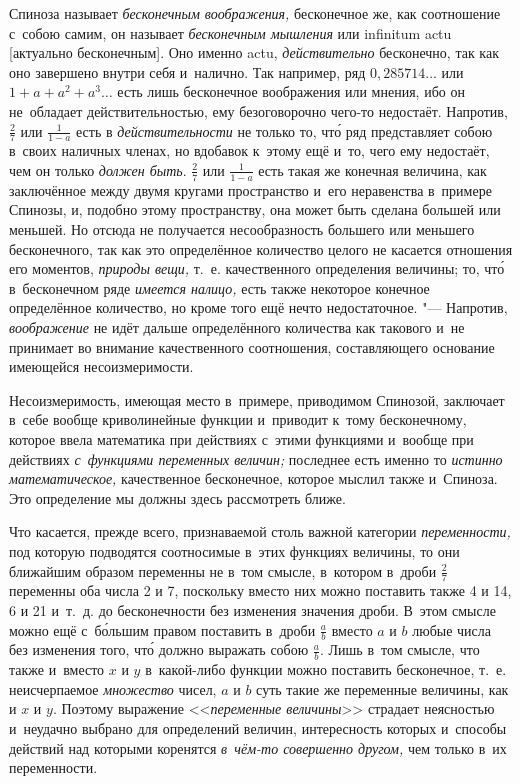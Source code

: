 Спиноза называет {\em бесконечным воображения,} бесконечное же, как соотношение
с~собою самим, он называет {\em бесконечным мышления} или infi\-ni\-tum actu
[актуально бесконечным]. Оно именно actu, {\em действительно} бесконечно, так
как оно завершено внутри себя и~налично. Так например, ряд $0{,}285714\ldots$
или $1+a+a^2+a^3\ldots$ есть лишь бесконечное воображения или мнения, ибо он
не~обладает действительностью, ему безоговорочно чего-то недостаёт. Напротив,
$\frac 2 7$ или $\frac 1{1-a}$ есть в {\em действительности} не только то, чт\'{о} ряд
представляет собою в~своих наличных членах, но вдобавок к~этому ещё и~то, чего
ему недостаёт, чем он только {\em должен быть}. $\frac 2 7$ или $\frac 1{1-a}$
есть такая же конечная величина, как заключённое между двумя кругами
пространство и~его неравенства в~примере Спинозы, и, подобно этому
пространству, она может быть сделана большей или меньшей. Но отсюда не
получается несообразность большего или меньшего бесконечного, так как это
определённое количество целого не касается отношения его моментов,
{\em природы вещи,} т.~е. качественного определения величины; то, чт\'{о} в~бесконечном
ряде {\em имеется налицо,} есть также некоторое конечное определённое количество,
но кроме того ещё нечто недостаточное. "--- Напротив, {\em воображение} не идёт
дальше определённого количества как такового и~не принимает во внимание
качественного соотношения, составляющего основание имеющейся несоизмеримости.

Несоизмеримость, имеющая место в~примере, приводимом Спинозой, заключает в~себе
вообще криволинейные функции и~приводит к~тому бесконечному, которое ввела
математика при действиях с~этими функциями и~вообще при действиях
{\em с~функциями переменных величин;} последнее есть именно то
{\em истинно математическое,} качественное бесконечное, которое мыслил
также и~Спиноза. Это определение мы должны здесь рассмотреть ближе.

Что касается, прежде всего, признаваемой столь важной категории
{\em переменности,} под которую подводятся соотносимые в~этих функциях
величины, то они ближайшим образом переменны не в~том смысле, в~котором в~дроби
$\frac 2 7$ переменны оба числа 2 и 7, поскольку вместо них можно поставить
также 4 и 14, 6 и 21 и~т.~д. до бесконечности без изменения значения дроби.
В~этом смысле можно ещё с~б\'{о}льшим правом поставить в~дроби $\frac a b$ вместо
$a$ и $b$ любые числа без изменения того, чт\'{о} должно выражать собою
$\frac a b$. Лишь в~том смысле, что также и~вместо $x$ и $y$ в~какой-либо
функции можно поставить бесконечное, т.~е. неисчерпаемое {\em множество} чисел,
$a$ и $b$ суть такие же переменные величины, как и $x$ и $y$. Поэтому выражение
<<{\em переменные величины}>> страдает неясностью и~неудачно выбрано для
определений величин, интересность которых и~способы действий над которыми
коренятся {\em в~чём-то совершенно другом,} чем только в~их переменности.

